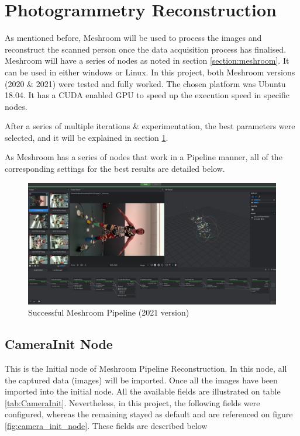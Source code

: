 \documentclass[12pt]{report}
\begin{document}
  
  
  





  \section{Photogrammetry Reconstruction}
  \label{section:meshroom_method}
  As mentioned before, Meshroom will be used to process the images and reconstruct the scanned person once the data acquisition process has finalised. 
  Meshroom will have a series of nodes as noted in section \ref{section:meshroom}. It can be used in either windows or Linux. In this project, both Meshroom versions
  (2020 \& 2021) were tested and fully worked. The chosen platform was Ubuntu 18.04. It has a CUDA enabled GPU  to speed up the execution speed in specific nodes.
  
  After a series of multiple iterations \& experimentation, the best parameters were selected, and it will be explained in section \ref{section:meshroom_method}.
  
  As Meshroom has a series of nodes that work in a Pipeline manner, all of the corresponding settings for the best results are detailed below.
  
  \begin{figure}[H]%
    \centering
   \includegraphics[width=1\textwidth]{meshroom_gui_reconstruction.png}
  \caption{Successful Meshroom Pipeline (2021 version)}
  \label{fig:final_meshroom} 
  \end{figure}
  
  





  \subsection*{CameraInit Node}
  This is the Initial node of Meshroom Pipeline Reconstruction. 
  In this node, all the captured data (images) will be imported.
  Once all the images have been imported into the initial node.
  All the available fields are illustrated on table \ref{tab:CameraInit}. Nevertheless, in this project, the following fields were configured, whereas the remaining stayed as default and are referenced on figure \ref{fig:camera_init_node}.
  These fields are described below
  
\end{document}
